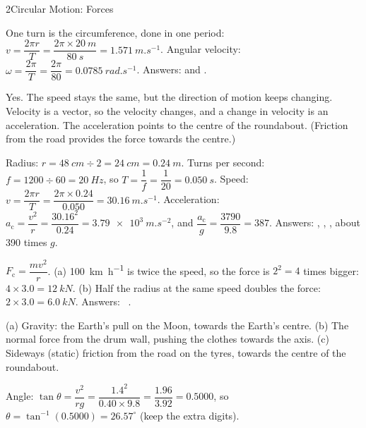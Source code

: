 \begin{chapteranswers}{2}{Circular Motion: Forces}
  \item One turn is the circumference, done in one period:
        $v = \dfrac{2\pi r}{T} = \dfrac{2\pi \times \qty{20}{m}}{\qty{80}{s}} = \qty{1.571}{m.s^{-1}}$.
        Angular velocity: $\omega = \dfrac{2\pi}{T} = \dfrac{2\pi}{80} = \qty{0.0785}{rad.s^{-1}}$.
        Answers:  and .
  \item Yes. The speed stays the same, but the direction of motion keeps changing. Velocity
        is a vector, so the velocity changes, and a change in velocity is an acceleration.
        The acceleration points to the centre of the roundabout. (Friction from the road
        provides the force towards the centre.)
  \item Radius: $r = \qty{48}{cm} \div 2 = \qty{24}{cm} = \qty{0.24}{m}$.
        Turns per second: $f = 1200 \div 60 = \qty{20}{Hz}$, so
        $T = \dfrac{1}{f} = \dfrac{1}{20} = \qty{0.050}{s}$.
        Speed: $v = \dfrac{2\pi r}{T} = \dfrac{2\pi \times 0.24}{0.050} = \qty{30.16}{m.s^{-1}}$.
        Acceleration: $a_\mathrm{c} = \dfrac{v^2}{r} = \dfrac{30.16^2}{0.24} = \qty{3.79e3}{m.s^{-2}}$,
        and $\dfrac{a_\mathrm{c}}{g} = \dfrac{3790}{9.8} = 387$.
        Answers: , ,
        , about 390 times $g$.
  \item $F_\mathrm{c} = \dfrac{mv^2}{r}$. (a) \qty{100}{km.h^{-1}} is twice the speed, so the
        force is $2^2 = 4$ times bigger: $4 \times 3.0 = \qty{12}{kN}$.
        (b) Half the radius at the same speed doubles the force: $2 \times 3.0 = \qty{6.0}{kN}$.
        Answers:  \ .
  \item (a) Gravity: the Earth's pull on the Moon, towards the Earth's centre.
        (b) The normal force from the drum wall, pushing the clothes towards the axis.
        (c) Sideways (static) friction from the road on the tyres, towards the centre of
        the roundabout.
  \item Angle: $\tan\theta = \dfrac{v^2}{rg} = \dfrac{1.4^2}{0.40 \times 9.8} = \dfrac{1.96}{3.92}
        = 0.5000$, so $\theta = \tan^{-1}(0.5000) = 26.57^\circ$ (keep the extra digits).

\end{chapteranswers}
